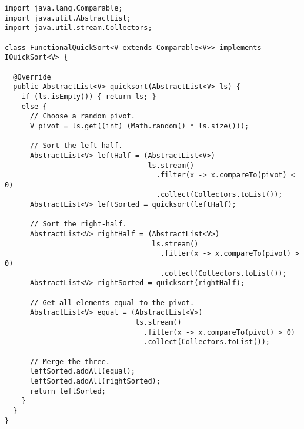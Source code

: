 \begin{lstlisting}[language=MyJava]
import java.lang.Comparable;
import java.util.AbstractList;
import java.util.stream.Collectors;

class FunctionalQuickSort<V extends Comparable<V>> implements IQuickSort<V> {

  @Override
  public AbstractList<V> quicksort(AbstractList<V> ls) {
    if (ls.isEmpty()) { return ls; }
    else {
      // Choose a random pivot.
      V pivot = ls.get((int) (Math.random() * ls.size()));

      // Sort the left-half.
      AbstractList<V> leftHalf = (AbstractList<V>) 
                                  ls.stream()
                                    .filter(x -> x.compareTo(pivot) < 0)
                                    .collect(Collectors.toList());
      AbstractList<V> leftSorted = quicksort(leftHalf);

      // Sort the right-half.
      AbstractList<V> rightHalf = (AbstractList<V>) 
                                   ls.stream()
                                     .filter(x -> x.compareTo(pivot) > 0)
                                     .collect(Collectors.toList());
      AbstractList<V> rightSorted = quicksort(rightHalf);

      // Get all elements equal to the pivot.
      AbstractList<V> equal = (AbstractList<V>) 
                               ls.stream()
                                 .filter(x -> x.compareTo(pivot) > 0)
                                 .collect(Collectors.toList());

      // Merge the three.
      leftSorted.addAll(equal);
      leftSorted.addAll(rightSorted);
      return leftSorted;
    }
  }
}
\end{lstlisting}

